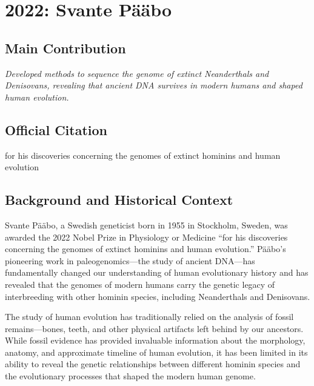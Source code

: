 \chapter[2022 --- Paabo]{2022: Svante P\"a\"abo}
\label{ch:2022_svantepaabo}

\section*{Main Contribution}

\textit{Developed methods to sequence the genome of extinct Neanderthals and Denisovans, revealing that ancient DNA survives in modern humans and shaped human evolution.}\cite{nobel-2022,lecture-2022}

\section{Official Citation}

for his discoveries concerning the genomes of extinct hominins and human evolution

\section{Background and Historical Context}

Svante P\"a\"abo, a Swedish geneticist born in 1955 in Stockholm, Sweden, was awarded the 2022 Nobel Prize in Physiology or Medicine ``for his discoveries concerning the genomes of extinct hominins and human evolution.'' P\"a\"abo's pioneering work in paleogenomics---the study of ancient DNA---has fundamentally changed our understanding of human evolutionary history and has revealed that the genomes of modern humans carry the genetic legacy of interbreeding with other hominin species, including Neanderthals and Denisovans.

The study of human evolution has traditionally relied on the analysis of fossil remains---bones, teeth, and other physical artifacts left behind by our ancestors. While fossil evidence has provided invaluable information about the morphology, anatomy, and approximate timeline of human evolution, it has been limited in its ability to reveal the genetic relationships between different hominin species and the evolutionary processes that shaped the modern human genome.

